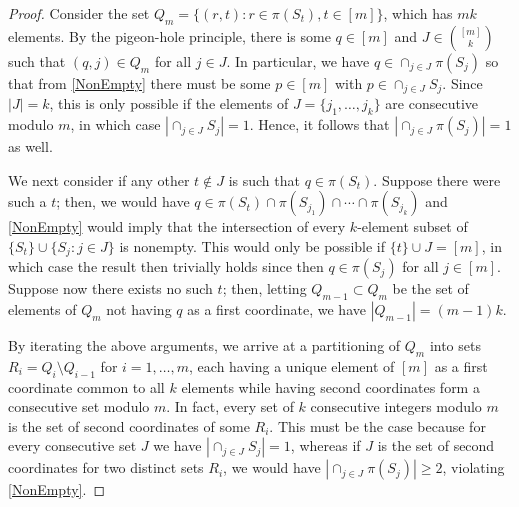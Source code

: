 \documentclass[journal, twocolumn]{IEEEtran}
\begin{document}
\begin{proof} Consider the set $Q_m = \{ (r,t) : r \in \pi(S_t), t \in [m] \}$, which has $mk$ elements. By the pigeon-hole principle, there is some $q \in [m]$ and $J \in {[m] \choose k}$ such that $(q, j) \in Q_m$ for all $j \in J$. In particular, we have $q \in \cap_{j \in J} \pi(S_j)$ so that from \eqref{NonEmpty} there must be some $p \in [m]$ with $p \in \cap_{j \in J} S_j$. Since $|J| = k$, this is only possible if the elements of $J = \{j_1, \ldots, j_k\}$ are consecutive modulo $m$, in which case $|\cap_{j \in J} S_j| = 1$. Hence, it follows that $|\cap_{j \in J} \pi(S_j)| = 1$ as well.

We next consider if any other $t \notin J$ is such that $q \in \pi(S_t)$. Suppose there were such a $t$; then, we would have \mbox{$q \in \pi(S_t) \cap \pi(S_{j_1}) \cap \cdots \cap \pi(S_{j_k})$} and \eqref{NonEmpty} would imply that the intersection of every $k$-element subset of $\{S_t\} \cup \{S_j: j \in J\}$ is nonempty. This would only be possible if $\{t\} \cup J = [m]$, in which case the result then trivially holds since then $q \in \pi(S_j)$ for all $j \in [m]$.  Suppose now there exists no such $t$; then, letting $Q_{m-1} \subset Q_m$ be the set of elements of $Q_m$ not having $q$ as a first coordinate, we have $|Q_{m-1}| = (m-1)k$. 

By iterating the above arguments, we arrive at a partitioning of $Q_m$ into sets $R_i = Q_i \setminus Q_{i-1}$ for $i = 1, \ldots, m$, each having a unique element of $[m]$ as a first coordinate common to all $k$ elements while having second coordinates form a consecutive set modulo $m$. In fact, every set of $k$ consecutive integers modulo $m$ is the set of second coordinates of some $R_i$. This must be the case because for every consecutive set $J$ we have $|\cap_{j \in J} S_j| = 1$, whereas if $J$ is the set of second coordinates for two distinct sets $R_i$, we would have \mbox{$|\cap_{j \in J} \pi(S_j)| \geq 2$}, violating \eqref{NonEmpty}. 
\end{proof}
\end{document}
